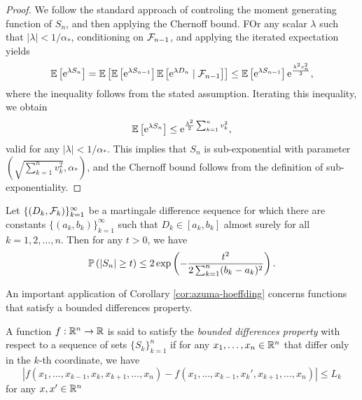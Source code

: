 \begin{proof}
	We follow the standard approach of controling the moment generating function of \(S_{n}\), and then applying the Chernoff bound. FOr any scalar \(\lambda\) such that \(|\lambda|<1/\alpha_{*}\), conditioning on \({\mathcal F}_{n-1}\), and applying the iterated expectation yields
	\begin{equation*}
		{\mathbb E}\left[\mathrm{e}^{\lambda S_{n}}\right]={\mathbb E}\left[{\mathbb E}\left[\mathrm{e}^{\lambda S_{n-1}}\right]{\mathbb E}\left[\mathrm{e}^{\lambda D_{n}}\mid {\mathcal F}_{n-1}\right]\right]\leq {\mathbb E}\left[\mathrm{e}^{\lambda S_{n-1}}\right]\mathrm{e}^{\frac{\lambda^{2}v_{n}^{2}}{2}},
	\end{equation*}
	where the inequality follows from the stated assumption. Iterating this inequality, we obtain
	\begin{equation*}
		{\mathbb E}\left[\mathrm{e}^{\lambda S_{n}}\right]\leq\mathrm{e}^{\frac{\lambda^{2}}{2}\sum_{k=1}^{n}v_{k}^{2}},
	\end{equation*}
	valid for any \(|\lambda|<1/\alpha_{*}\). This implies that \(S_{n}\) is sub-exponential with parameter \((\sqrt{\sum_{k=1}^{n}v_{k}^{2}},\alpha_{*})\), and the Chernoff bound follows from the definition of sub-exponentiality.
\end{proof}

\begin{corollary}
	\label{cor:azuma-hoeffding}
	Let \(\{(D_{k},{\mathcal F}_{k})\}_{k=1}^{\infty}\) be a martingale difference sequence for which there are constants \(\{(a_{k},b_{k})\}_{k=1}^{\infty}\) such that \(D_{k}\in[a_{k},b_{k}]\) almost surely for all \(k=1,2,\ldots,n\). Then for any \(t>0\), we have
	\begin{equation*}
		{\mathbb P}\left(\left|S_{n}\right|\geq t\right)\leq 2\exp\left(-\frac{t^{2}}{2\sum_{k=1}^{n}(b_{k}-a_{k})^{2}}\right).
	\end{equation*}
\end{corollary}

An important application of Corollary \ref{cor:azuma-hoeffding} concerns functions that satisfy a bounded differences property.

\begin{definition}
	A function \(f:{\mathbb R}^{n}\to{\mathbb R}\) is said to satisfy the \textit{bounded differences property} with respect to a sequence of sets \(\{S_{k}\}_{k=1}^{n}\) if for any \(x_{1},\ldots,x_{n}\in{\mathbb R}^{n}\) that differ only in the \(k\)-th coordinate, we have
	\begin{equation*}
		\left|f(x_{1},\ldots,x_{k-1},x_{k},x_{k+1},\ldots,x_{n})-f(x_{1},\ldots,x_{k-1},x_{k}',x_{k+1},\ldots,x_{n})\right|\leq L_{k}
	\end{equation*}
	for any \(x,x'\in{\mathbb R}^{n}\) 
\end{definition}

